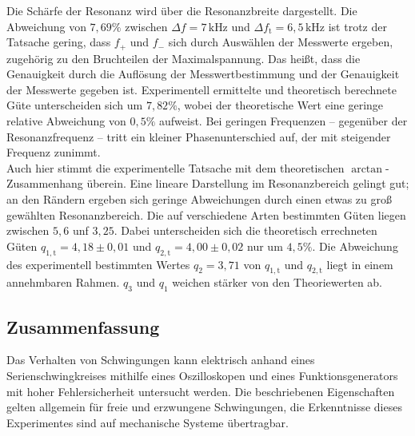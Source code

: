 Die Schärfe der Resonanz wird über die Resonanzbreite dargestellt. 
Die Abweichung von $7,69\%$ zwischen $\Delta{f}=7\,\si{\kilo\hertz}$ und $\Delta{f_\mathup{t}}=6,5\,\si{\kilo\hertz}$ 
ist  trotz der Tatsache gering, dass $f_+$ und $f_-$ sich durch Auswählen der Messwerte ergeben, zugehörig zu den Bruchteilen der Maximalspannung. 
Das heißt, dass die Genauigkeit durch die Auflösung der Messwertbestimmung und der Genauigkeit der Messwerte gegeben ist. Experimentell ermittelte und theoretisch berechnete Güte unterscheiden sich um $7,82\%$, wobei der theoretische Wert eine geringe relative Abweichung von $0,5\%$ aufweist.
Bei geringen Frequenzen -- gegenüber der Resonanzfrequenz -- tritt ein kleiner Phasenunterschied auf, der mit steigender Frequenz zunimmt. \\
Auch hier stimmt die experimentelle Tatsache mit dem theoretischen $\arctan$-Zusammenhang überein. 
Eine lineare Darstellung im Resonanzbereich gelingt gut; 
an den Rändern ergeben sich geringe Abweichungen durch einen etwas zu groß gewählten Resonanzbereich.
Die auf verschiedene Arten bestimmten Güten liegen zwischen $5,6$ unf $3,25$. Dabei unterscheiden sich die theoretisch errechneten Güten $q_{1,\mathup{t}}=4,18\pm0,01$ und $q_{2,\mathup{t}}=4,00\pm0,02$ nur um $4,5\%$. Die Abweichung des experimentell bestimmten Wertes $q_2=3,71$ von  $q_{1,\mathup{t}}$ und  $q_{2,\mathup{t}}$ liegt in einem annehmbaren Rahmen. $q_3$ und $q_1$ weichen stärker von den Theoriewerten ab.

\subsection{Zusammenfassung}
Das Verhalten von Schwingungen kann elektrisch anhand eines Serienschwingkreises mithilfe eines Oszilloskopen und eines Funktionsgenerators mit hoher Fehlersicherheit untersucht werden.
Die beschriebenen Eigenschaften gelten allgemein für freie und erzwungene Schwingungen, die Erkenntnisse dieses Experimentes sind auf mechanische Systeme übertragbar.
